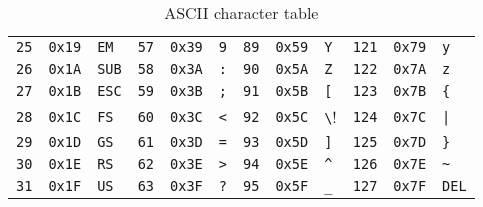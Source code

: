 \begin{table}[h!]
\begin{tabular}{|r r l|r r l|r r l|r r l|}
		\verb!25! & \verb!0x19! & \verb!EM!  & \verb!57! & \verb!0x39! & \verb!9! & \verb!89! & \verb!0x59! & \verb!Y! & \verb!121! & \verb!0x79! & \verb!y!  \\
		\verb!26! & \verb!0x1A! & \verb!SUB! & \verb!58! & \verb!0x3A! & \verb!:! & \verb!90! & \verb!0x5A! & \verb!Z! & \verb!122! & \verb!0x7A! & \verb!z!  \\
		\verb!27! & \verb!0x1B! & \verb!ESC! & \verb!59! & \verb!0x3B! & \verb!;! & \verb!91! & \verb!0x5B! & \verb![! & \verb!123! & \verb!0x7B! & \verb!{!  \\
		\verb!28! & \verb!0x1C! & \verb!FS!  & \verb!60! & \verb!0x3C! & \verb!<! & \verb!92! & \verb!0x5C! & \verb!\! & \verb!124! & \verb!0x7C! & \verb!|!  \\
		\verb!29! & \verb!0x1D! & \verb!GS!  & \verb!61! & \verb!0x3D! & \verb!=! & \verb!93! & \verb!0x5D! & \verb!]! & \verb!125! & \verb!0x7D! & \verb!}!  \\
		\verb!30! & \verb!0x1E! & \verb!RS!  & \verb!62! & \verb!0x3E! & \verb!>! & \verb!94! & \verb!0x5E! & \verb!^! & \verb!126! & \verb!0x7E! & \verb!~!  \\
		\verb!31! & \verb!0x1F! & \verb!US!  & \verb!63! & \verb!0x3F! & \verb!?! & \verb!95! & \verb!0x5F! & \verb!_! & \verb!127! & \verb!0x7F! & \verb!DEL!\\
		\hline
	\end{tabular}
	\caption{ASCII character table}
\end{table}

